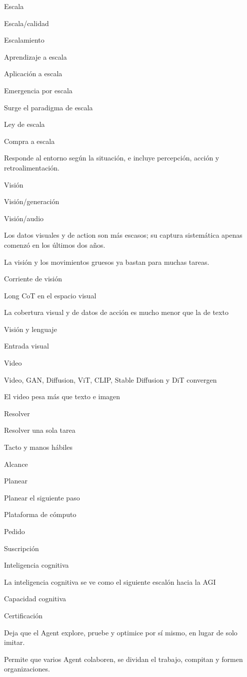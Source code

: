 \documentclass{article}
\begin{document}
Escala

Escala/calidad

Escalamiento

Aprendizaje a escala

Aplicación a escala

Emergencia por escala

Surge el paradigma de escala

Ley de escala

Compra a escala

Responde al entorno según la situación, e incluye percepción, acción y retroalimentación.

Visión

Visión/generación

Visión/audio

Los datos visuales y de action son más escasos; su captura sistemática apenas comenzó en los últimos dos años.

La visión y los movimientos gruesos ya bastan para muchas tareas.

Corriente de visión

Long CoT en el espacio visual

La cobertura visual y de datos de acción es mucho menor que la de texto

Visión y lenguaje

Entrada visual

Video

Video, GAN, Diffusion, ViT, CLIP, Stable Diffusion y DiT convergen

El video pesa más que texto e imagen

Resolver

Resolver una sola tarea

Tacto y manos hábiles

Alcance

Planear

Planear el siguiente paso

Plataforma de cómputo

Pedido

Suscripción

Inteligencia cognitiva

La inteligencia cognitiva se ve como el siguiente escalón hacia la AGI

Capacidad cognitiva

Certificación

Deja que el Agent explore, pruebe y optimice por sí mismo, en lugar de solo imitar.

Permite que varios Agent colaboren, se dividan el trabajo, compitan y formen organizaciones.
\end{document}
